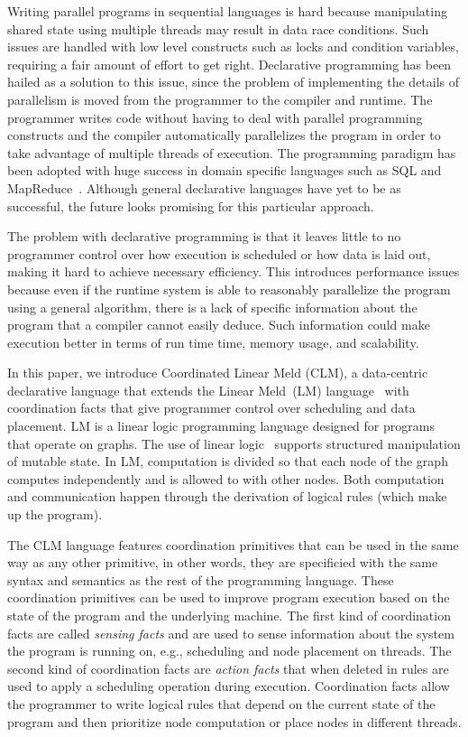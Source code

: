 Writing parallel programs in sequential languages is hard because manipulating
shared state using multiple threads may result in data race conditions. Such
issues are handled with low level constructs such as locks and condition
variables, requiring a fair amount of effort to get right.  Declarative
programming has been hailed as a solution to this issue, since the problem of
implementing the details of parallelism is moved from the programmer to the
compiler and runtime. The programmer writes code without having to deal with
parallel programming constructs and the compiler automatically parallelizes the
program in order to take advantage of multiple threads of execution.  The
programming paradigm has been adopted with huge success in domain specific
languages such as SQL and MapReduce~\cite{Dean:2008:MSD:1327452.1327492}.
Although general declarative languages have yet to be as successful, the future
looks promising for this particular approach.

The problem with declarative programming is that it leaves little to no
programmer control over how execution is scheduled or how data is laid out,
making it hard to achieve necessary efficiency. This introduces
performance issues because even if the runtime system is able to
reasonably parallelize the program using a general algorithm, there
is a lack of specific information about the program that a compiler
cannot easily deduce. Such information could make execution better in
terms of run time time, memory usage, and scalability.

In this paper, we introduce Coordinated Linear Meld (CLM), a data-centric declarative
language that extends the Linear Meld~(LM)
language~\cite{cruz-iclp14,cruz-ppdp14} with coordination facts that give
programmer control over scheduling and data placement. LM is a linear logic
programming language designed for programs that operate on graphs.  The use
of linear logic~\cite{girard-87} supports structured manipulation of mutable
state. In LM, computation is divided so that each node of the graph computes
independently and is allowed to  with other nodes.  Both
computation and communication happen through the derivation of logical rules
(which make up the program).

The CLM language features coordination primitives that can be used in the same
way as any other primitive, in other words, they are specificied with the same
syntax and semantics as the rest of the programming language. These coordination
primitives can be used to improve program execution based on the state of the
program and the underlying machine. The first kind of coordination facts are
called \emph{sensing facts} and are used to sense information about the system
the program is running on, e.g., scheduling and node placement on threads. The
second kind of coordination facts are \emph{action facts} that when deleted in
rules are used to apply a scheduling operation during execution. Coordination
facts allow the programmer to write logical rules that depend on the current
state of the program and then prioritize node computation or place nodes in
different threads.

